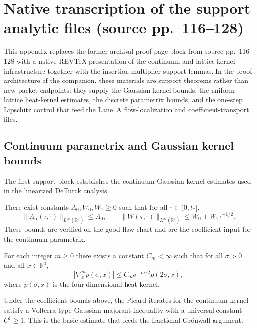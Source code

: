 \section{Native transcription of the support analytic files (source pp.~116--128)}
This appendix replaces the former archival proof-page block from source pp.~116--128 with a native REV\TeX{} presentation of the continuum and lattice kernel infrastructure together with the insertion-multiplier support lemmas. In the proof architecture of the companion, these materials are support theorems rather than new packet endpoints: they supply the Gaussian kernel bounds, the uniform lattice heat-kernel estimates, the discrete parametrix bounds, and the one-step Lipschitz control that feed the Lane~A flow-localization and coefficient-transport files.

\subsection{Continuum parametrix and Gaussian kernel bounds}
The first support block establishes the continuum Gaussian kernel estimates used in the linearized DeTurck analysis.

\begin{proposition}
There exist constants $A_0,W_0,W_1\ge 0$ such that for all $\tau\in(0,t_\ast]$,
\[
\|A_\alpha(\tau,\cdot)\|_{L^\infty(\mathbb R^4)}\le A_0,
\qquad
\|W(\tau,\cdot)\|_{L^\infty(\mathbb R^4)}\le W_0 + W_1\tau^{-1/2}.
\]
These bounds are verified on the good-flow chart and are the coefficient input for the continuum parametrix.
\end{proposition}

\begin{lemma}
For each integer $m\ge 0$ there exists a constant $C_m<\infty$ such that for all $\sigma>0$ and all $x\in\mathbb R^4$,
\[
|\nabla_x^m p(\sigma,x)|\le C_m\sigma^{-m/2}p(2\sigma,x),
\]
where $p(\sigma,x)$ is the four-dimensional heat kernel.
\end{lemma}

\begin{lemma}
Under the coefficient bounds above, the Picard iterates for the continuum kernel satisfy a Volterra-type Gaussian majorant inequality with a universal constant $C^\sharp\ge 1$. This is the basic estimate that feeds the fractional Gr\"onwall argument.
\end{lemma}

